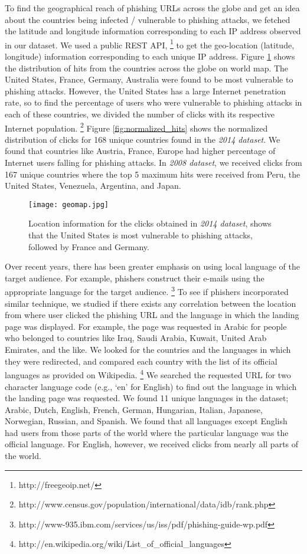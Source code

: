 \documentclass[conference]{IEEEtran}
\begin{document}
To find the geographical reach of phishing URLs across the globe and get an idea about the countries being infected / vulnerable to phishing attacks, we fetched the latitude and longitude information corresponding to each IP address observed in our dataset. We used a public REST API, \footnote{http://freegeoip.net/} to get the geo-location (latitude, longitude) information corresponding to each unique IP address. Figure \ref{fig:geomap} shows the distribution of hits from the countries across the globe on world map. The United States, France, Germany, Australia were found to be most vulnerable to phishing attacks. However, the United States has a large Internet penetration rate, so to find the percentage of users who were vulnerable to phishing attacks in each of these countries, we divided the number of clicks with its respective Internet population. \footnote{http://www.census.gov/population/international/data/idb/rank.php} Figure \ref{fig:normalized_hits} shows the normalized distribution of clicks for 168 unique countries found in the \textit{2014 dataset}. We found that countries like Austria, France, Europe had higher percentage of Internet users falling for phishing attacks. In \textit{2008 dataset}, we received clicks from 167 unique countries where the top 5 maximum hits were received from Peru, the United States, Venezuela, Argentina, and Japan.
\begin{figure}[h]
\centering
\texttt{[image: geomap.jpg]}
\caption{Location information for the clicks obtained in \textit{2014 dataset}, shows that the United States is most vulnerable to phishing attacks, followed by France and Germany.}
\label{fig:geomap}
\end{figure}
\newline\indent
Over recent years, there has been greater emphasis on using local language of the target audience. For example, phishers construct their e-mails using the appropriate language for the target audience. \footnote{http://www-935.ibm.com/services/us/iss/pdf/phishing-guide-wp.pdf} To see if phishers incorporated similar technique, we studied if there exists any correlation between the location from where user clicked the phishing URL and the language in which the landing page was displayed. For example, the page was requested in Arabic for people who belonged to countries like Iraq, Saudi Arabia, Kuwait, United Arab Emirates, and the like. We looked for the countries and the languages in which they were redirected, and compared each country with the list of its official languages as provided on Wikipedia. \footnote{http://en.wikipedia.org/wiki/List\_of\_official\_languages} We searched the requested URL for two character language code (e.g., `en' for English) to find out the language in which the landing page was requested. We found 11 unique languages in the dataset; Arabic, Dutch, English, French, German, Hungarian, Italian, Japanese, Norwegian, Russian, and Spanish. We found that all languages except English had users from those parts of the world where the particular language was the official language. For English, however, we received clicks from nearly all parts of the world.
\end{document}
